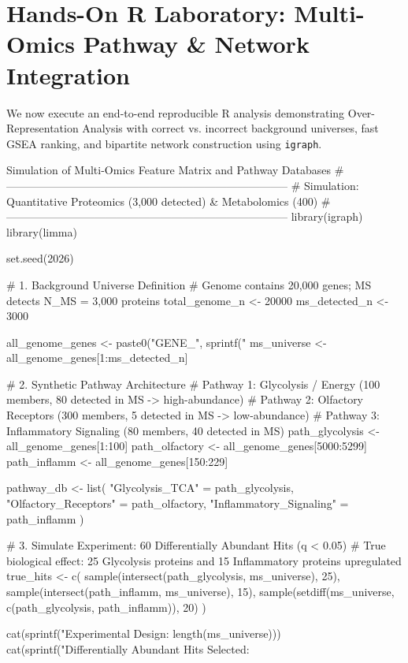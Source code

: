 \documentclass[11pt,twoside,openright]{book}
\begin{document}
\section{Hands-On R Laboratory: Multi-Omics Pathway \& Network Integration}

We now execute an end-to-end reproducible R analysis demonstrating Over-Representation Analysis with correct vs. incorrect background universes, fast GSEA ranking, and bipartite network construction using \texttt{igraph}.

\begin{rchunk}{Simulation of Multi-Omics Feature Matrix and Pathway Databases}
# -----------------------------------------------------------------------------
# Simulation: Quantitative Proteomics (3,000 detected) & Metabolomics (400)
# -----------------------------------------------------------------------------
library(igraph)
library(limma)

set.seed(2026)

# 1. Background Universe Definition
# Genome contains 20,000 genes; MS detects N_MS = 3,000 proteins
total_genome_n <- 20000
ms_detected_n  <- 3000

all_genome_genes <- paste0("GENE_", sprintf("%
ms_universe      <- all_genome_genes[1:ms_detected_n]

# 2. Synthetic Pathway Architecture
# Pathway 1: Glycolysis / Energy (100 members, 80 detected in MS -> high-abundance)
# Pathway 2: Olfactory Receptors (300 members, 5 detected in MS -> low-abundance)
# Pathway 3: Inflammatory Signaling (80 members, 40 detected in MS)
path_glycolysis <- all_genome_genes[1:100]
path_olfactory  <- all_genome_genes[5000:5299]
path_inflamm    <- all_genome_genes[150:229]

pathway_db <- list(
  "Glycolysis_TCA"         = path_glycolysis,
  "Olfactory_Receptors"    = path_olfactory,
  "Inflammatory_Signaling" = path_inflamm
)

# 3. Simulate Experiment: 60 Differentially Abundant Hits (q < 0.05)
# True biological effect: 25 Glycolysis proteins and 15 Inflammatory proteins upregulated
true_hits <- c(
  sample(intersect(path_glycolysis, ms_universe), 25),
  sample(intersect(path_inflamm, ms_universe), 15),
  sample(setdiff(ms_universe, c(path_glycolysis, path_inflamm)), 20)
)

cat(sprintf("Experimental Design: %
            length(ms_universe)))
cat(sprintf("Differentially Abundant Hits Selected: %
\end{rchunk}
\end{document}
